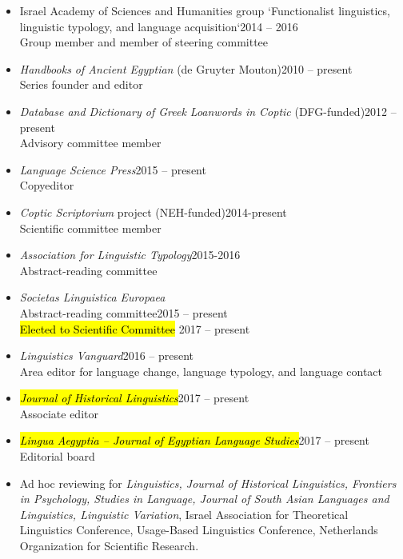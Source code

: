\documentclass[letterpaper,11pt]{article}
\begin{document}
\begin{itemize}
\vspace{-0.025 in}
\vspace*{-2pt}
\item Israel Academy of Sciences and Humanities group `Functionalist linguistics, linguistic typology, and language acquisition`\hfill{2014 -- 2016}\\
Group member and member of steering committee\\

\item \textit{Handbooks of Ancient Egyptian} (de Gruyter Mouton)\hfill{2010 -- present}\\Series founder and editor 

\item \textit{Database and Dictionary of Greek Loanwords in Coptic} (DFG-funded)\hfill{2012 -- present}\\Advisory committee member

\item \textit{Language Science Press}\hfill{2015 -- present}\\Copyeditor

\item \textit{Coptic Scriptorium} project (NEH-funded)\hfill{2014-present}\\Scientific committee member		

\item \textit{Association for Linguistic Typology}\hfill{2015-2016}	\\Abstract-reading committee

\item \textit{Societas Linguistica Europaea}\\Abstract-reading committee\hfill{2015 -- present}\\\hl{Elected to Scientific Committee} \hfill{2017 -- present}

\item \textit{Linguistics Vanguard}\hfill{2016 -- present}\\Area editor for language change, language typology, and language contact
\item \hl{\textit{Journal of Historical Linguistics}}\hfill{2017 -- present}\\Associate editor
\item {\hl{\textit{Lingua Aegyptia -- Journal of Egyptian Language Studies}}\hfill{2017 -- present}\\Editorial board}

\item Ad hoc reviewing for \textit{Linguistics, Journal of Historical Linguistics, Frontiers in Psychology, Studies in Language, Journal of South Asian Languages and Linguistics, Linguistic Variation}, Israel Association for Theoretical Linguistics Conference, Usage-Based Linguistics Conference, Netherlands Organization for Scientific Research.
 
\end{itemize}
\end{document}
